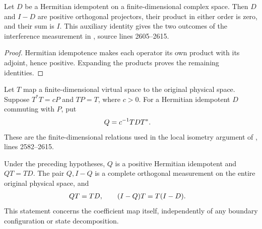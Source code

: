 \begin{lemma}
    \label{thm:peps_binary_projection_family}
    \leanok
    Let $D$ be a Hermitian idempotent on a finite-dimensional complex space.
    Then $D$ and $I-D$ are positive orthogonal projectors, their product in
    either order is zero, and their sum is $I$. This auxiliary identity
    gives the two outcomes of the interference measurement in
    \cite[Section~6.6]{Schuch2010PEPS}, source lines 2605--2615.
\end{lemma}

\begin{proof}\leanok
    Hermitian idempotence makes each operator its own product with its
    adjoint, hence positive. Expanding the products proves the remaining
    identities.
\end{proof}

\begin{definition}
    \label{def:peps_scaled_projection_transport}
    \leanok
    Let $T$ map a finite-dimensional virtual space to the original physical
    space. Suppose $T^*T=cP$ and $TP=T$, where $c>0$. For a Hermitian
    idempotent $D$ commuting with $P$, put
    \begin{align}
        Q & =c^{-1}TDT^*.\notag
    \end{align}
    These are the finite-dimensional relations used in the local isometry
    argument of \cite[Section~6.6]{Schuch2010PEPS}, lines 2582--2615.
\end{definition}

\begin{lemma}
    \label{thm:peps_scaled_projection_transport}
    \leanok
    Under the preceding hypotheses, $Q$ is a positive Hermitian idempotent
    and $QT=TD$. The pair $Q,I-Q$ is a complete orthogonal measurement on
    the entire original physical space, and
    \begin{align}
        QT & =TD,\qquad (I-Q)T=T(I-D).\notag
    \end{align}
    This statement concerns the coefficient map itself, independently of
    any boundary configuration or state decomposition.
\end{lemma}

